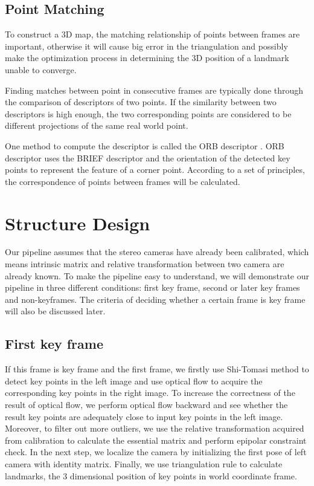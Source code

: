\documentclass{easychair}
\begin{document}
\subsection{Point Matching}
To construct a 3D map, the matching relationship of points between frames are important, otherwise it will cause big error in the triangulation and possibly make the optimization process in determining the 3D position of a landmark unable to converge.

Finding matches between point in consecutive frames are typically done through the comparison of descriptors of two points. If the similarity between two descriptors is high enough, the two corresponding points are considered to be different projections of the same real world point. 

One method to compute the descriptor is called the ORB descriptor \cite{orb}. ORB descriptor uses the BRIEF descriptor \cite{brief} and the orientation of the detected key points to represent the feature of a corner point. According to a set of principles, the correspondence of points between frames will be calculated.

\section{Structure Design}


Our pipeline assumes that the stereo cameras have already been calibrated, which means intrinsic matrix and relative transformation between two camera are already known. To make the pipeline easy to understand, we will demonstrate our pipeline in three different conditions: first key frame, second or later key frames and non-keyframes. The criteria of deciding whether a certain frame is key frame will also be discussed later.

\subsection{First key frame}
If this frame is key frame and the first frame, we firstly use Shi-Tomasi method to detect key points in the left image and use optical flow to acquire the corresponding key points in the right image. To increase the correctness of the result of optical flow, we perform optical flow backward and see whether the result key points are adequately close to input key points in the left image. Moreover, to filter out more outliers, we use the relative transformation acquired from calibration to calculate the essential matrix and perform epipolar constraint check. In the next step, we localize the camera by initializing the first pose of left camera with identity matrix. Finally, we use triangulation rule to calculate landmarks, the 3 dimensional position of key points in world coordinate frame. 
\end{document}

